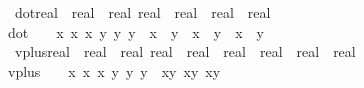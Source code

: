 \begin{isabellebody}
\isanewline
{}\isamarkupfalse%
\ dot{\isacharcolon}{\kern0pt}{\isacharcolon}{\kern0pt}{\isachardoublequoteopen}{\isacharparenleft}{\kern0pt}real\ {\isasymtimes}\ real\ {\isasymtimes}\ real{\isacharparenright}{\kern0pt}\ {\isasymRightarrow}{\isacharparenleft}{\kern0pt}real\ {\isasymtimes}\ real\ {\isasymtimes}\ real{\isacharparenright}{\kern0pt}\ {\isasymRightarrow}\ real{\isachardoublequoteclose}\ \isanewline
{\isachardoublequoteopen}dot\ {\isacharequal}{\kern0pt}\ \ {\isacharparenleft}{\kern0pt}{\isasymlambda}\ {\isacharparenleft}{\kern0pt}x{}{\isacharcomma}{\kern0pt}\ x{}{\isacharcomma}{\kern0pt}\ x{}{\isacharparenright}{\kern0pt}\ {\isacharparenleft}{\kern0pt}y{}{\isacharcomma}{\kern0pt}\ y{}{\isacharcomma}{\kern0pt}\ y{}{\isacharparenright}{\kern0pt}\ {\isachardot}{\kern0pt}\ {\isacharparenleft}{\kern0pt}x{}\ {\isacharasterisk}{\kern0pt}\ y{}\ {\isacharplus}{\kern0pt}\ x{}\ {\isacharasterisk}{\kern0pt}\ y{}\ {\isacharplus}{\kern0pt}\ x{}\ {\isacharasterisk}{\kern0pt}\ y{}{\isacharparenright}{\kern0pt}{\isacharparenright}{\kern0pt}{\isachardoublequoteclose}\isanewline
\isanewline
{}\isamarkupfalse%
\ vplus{\isacharcolon}{\kern0pt}{\isacharcolon}{\kern0pt}{\isachardoublequoteopen}{\isacharparenleft}{\kern0pt}real\ {\isasymtimes}\ real\ {\isasymtimes}\ real{\isacharparenright}{\kern0pt}\ {\isasymRightarrow}{\isacharparenleft}{\kern0pt}real\ {\isasymtimes}\ real\ {\isasymtimes}\ real{\isacharparenright}{\kern0pt}\ {\isasymRightarrow}\ {\isacharparenleft}{\kern0pt}real\ {\isasymtimes}\ real\ {\isasymtimes}\ real{\isacharparenright}{\kern0pt}{\isachardoublequoteclose}\ \ \isanewline
{\isachardoublequoteopen}vplus\ {\isacharequal}{\kern0pt}\ \ {\isacharparenleft}{\kern0pt}{\isasymlambda}\ {\isacharparenleft}{\kern0pt}x{}{\isacharcomma}{\kern0pt}\ x{}{\isacharcomma}{\kern0pt}\ x{}{\isacharparenright}{\kern0pt}\ {\isacharparenleft}{\kern0pt}y{}{\isacharcomma}{\kern0pt}\ y{}{\isacharcomma}{\kern0pt}\ y{}{\isacharparenright}{\kern0pt}\ {\isachardot}{\kern0pt}\ {\isacharparenleft}{\kern0pt}x{}{\isacharplus}{\kern0pt}y{}{\isacharcomma}{\kern0pt}\ x{}{\isacharplus}{\kern0pt}y{}{\isacharcomma}{\kern0pt}\ x{}{\isacharplus}{\kern0pt}y{}{\isacharparenright}{\kern0pt}{\isacharparenright}{\kern0pt}{\isachardoublequoteclose}\isanewline

\end{isabellebody}
